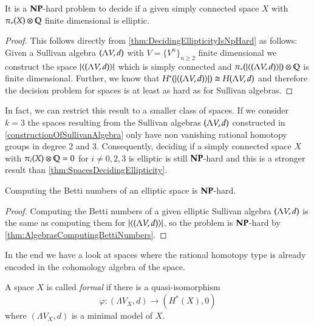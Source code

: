 \begin{Theorem}
 \label{thm:SpacesDecidingEllipticity}
 It is a $\mathbf{NP}$-hard problem to decide if a given simply connected space $X$ with  $\pi_*(X) \otimes \mathbb{Q}$
 finite dimensional is elliptic.
\end{Theorem}

\begin{proof}
 This follows directly from \ref{thm:DecidingEllipticityIsNpHard} as follows:
 Given a  Sullivan algebra $(\Lambda V,d)$ with $V = { \{ V^n \} }_{n \geq 2}$ finite dimensional we construct the 
 space $| \langle (\Lambda V,d) \rangle |$ which is simply connected and 
 $\pi_*(| \langle (\Lambda V,d) \rangle |) \otimes \mathbb{Q}$ is finite dimensional. Further, we know that 
 $H^*(| \langle (\Lambda V,d) \rangle |) \cong H (\Lambda V,d)$ and therefore the decision problem for 
 spaces is at least as hard as for Sullivan algebras.
\end{proof}

\begin{Remark}
 In fact, we can restrict this result to a smaller class of spaces. If we consider $k = 3$ the spaces resulting from
 the Sullivan algebras $(\Lambda V,d)$ constructed in \ref{constructionOfSullivanAlgebra} only have non vanishing rational
 homotopy groups in degree 2 and 3. Consequently, deciding if a simply connected space $X$ with
 $\pi_i(X) \otimes \mathbb{Q} = 0$ for $i \neq 0,2,3$ is elliptic is still $\mathbf{NP}$-hard and this is a stronger result than
 \ref{thm:SpacesDecidingEllipticity}.
\end{Remark}

\begin{Theorem}
 Computing the Betti numbers of an elliptic space is $\mathbf{NP}$-hard.
\end{Theorem}

\begin{proof}
 Computing the Betti numbers of a given elliptic Sullivan algebra $(\Lambda V,d)$ is the same as computing
 them for $ | \langle (\Lambda V,d) \rangle |$, so the problem is $\mathbf{NP}$-hard by \ref{thm:AlgebrasComputingBettiNumbers}.
\end{proof}


In the end we have a look at spaces where the rational homotopy type is already encoded in the cohomology 
algebra of the space.

\begin{Definition}
 A space $X$ is called \emph{formal} if there is a quasi-isomorphism
 $$ \varphi \colon (\Lambda V_X , d) \to (H^*(X),0)$$
 where $(\Lambda V_X,d)$ is a minimal model of $X$.
\end{Definition}


